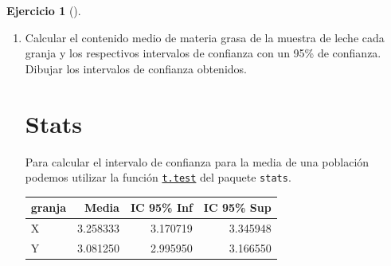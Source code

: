 \documentclass[
  a4paper,
]{scrreport}
\newenvironment{Shaded}{\begin{snugshade}}{\end{snugshade}}
\newcommand{\AttributeTok}[1]{\textcolor[rgb]{0.40,0.45,0.13}{#1}}
\newcommand{\DecValTok}[1]{\textcolor[rgb]{0.68,0.00,0.00}{#1}}
\newcommand{\FunctionTok}[1]{\textcolor[rgb]{0.28,0.35,0.67}{#1}}
\newcommand{\NormalTok}[1]{\textcolor[rgb]{0.00,0.23,0.31}{#1}}
\newcommand{\OtherTok}[1]{\textcolor[rgb]{0.00,0.23,0.31}{#1}}
\newcommand{\SpecialCharTok}[1]{\textcolor[rgb]{0.37,0.37,0.37}{#1}}
\newcommand{\StringTok}[1]{\textcolor[rgb]{0.13,0.47,0.30}{#1}}
\theoremstyle{definition}
\newtheorem{exercise}{Ejercicio}[chapter]
\theoremstyle{remark}
\begin{document}
\begin{exercise}[]
\begin{enumerate}
\begin{tcolorbox}
  \end{tcolorbox}
\item
  Calcular el contenido medio de materia grasa de la muestra de leche
  cada granja y los respectivos intervalos de confianza con un 95\% de
  confianza. Dibujar los intervalos de confianza obtenidos.

  \begin{tcolorbox}[enhanced jigsaw, colframe=quarto-callout-tip-color-frame, toprule=.15mm, bottomtitle=1mm, breakable, opacitybacktitle=0.6, toptitle=1mm, colback=white, bottomrule=.15mm, title=\textcolor{quarto-callout-tip-color}{\faLightbulb}\hspace{0.5em}{Solución}, arc=.35mm, left=2mm, titlerule=0mm, rightrule=.15mm, coltitle=black, leftrule=.75mm, opacityback=0, colbacktitle=quarto-callout-tip-color!10!white]

  \section{Stats}

  Para calcular el intervalo de confianza para la media de una población
  podemos utilizar la función
  \href{https://www.rdocumentation.org/packages/stats/versions/3.6.2/topics/t.test}{\texttt{t.test}}
  del paquete \texttt{stats}.

\begin{Shaded}
\end{Shaded}

  \begin{longtable}[]{@{}lrrr@{}}
  \toprule\noalign{}
  granja & Media & IC 95\% Inf & IC 95\% Sup \\
  \midrule\noalign{}
  \endhead
  \bottomrule\noalign{}
  \endlastfoot
  X & 3.258333 & 3.170719 & 3.345948 \\
  Y & 3.081250 & 2.995950 & 3.166550 \\
  \end{longtable}


\end{tcolorbox}
\end{enumerate}
\end{exercise}
\end{document}
